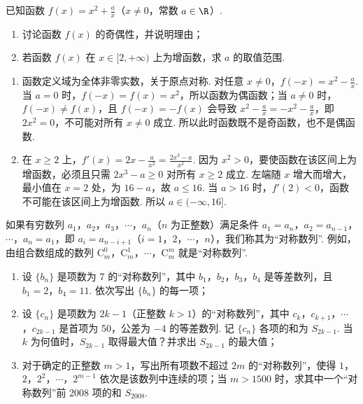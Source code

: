 \begin{problem}
已知函数 \( f(x) = x^2 + \frac{a}{x} \)（\(x \neq 0\)，常数 \(a \in \R\)）.

\begin{enumerate}
\item 讨论函数 \( f(x) \) 的奇偶性，并说明理由；
\item 若函数 \( f(x) \) 在 \( x \in [2, +\infty) \) 上为增函数，求 \( a \) 的取值范围.
\end{enumerate}
\end{problem}

\begin{solution}
\begin{enumerate}
\item 函数定义域为全体非零实数，关于原点对称. 对任意 \(x\ne0\)，\(f(-x)=x^2-\frac{a}{x}\). 当 \(a=0\) 时，\(f(-x)=f(x)=x^2\)，所以函数为偶函数；当 \(a\ne0\) 时，\(f(-x)\ne f(x)\)，且 \(f(-x)=-f(x)\) 会导致 \(x^2-\frac{a}{x}=-x^2-\frac{a}{x}\)，即 \(2x^2=0\)，不可能对所有 \(x\ne0\) 成立. 所以此时函数既不是奇函数，也不是偶函数.
\item 在 \(x\geqslant2\) 上，\(f'(x)=2x-\frac{a}{x^2}=\frac{2x^3-a}{x^2}\). 因为 \(x^2>0\)，要使函数在该区间上为增函数，必须且只需 \(2x^3-a\geqslant0\) 对所有 \(x\geqslant2\) 成立. 左端随 \(x\) 增大而增大，最小值在 \(x=2\) 处，为 \(16-a\)，故 \(a\leqslant16\). 当 \(a>16\) 时，\(f'(2)<0\)，函数不可能在该区间上为增函数. 所以 \(a\in(-\infty,16]\).
\end{enumerate}
\end{solution}

\begin{problem}
如果有穷数列 \(a_1\)，\(a_2\)，\(a_3\)，\(\cdots\)，\(a_n\)（\(n\) 为正整数）满足条件 \(a_1 = a_n\)，\(a_2 = a_{n-1}\)，\(\cdots\)，\(a_n = a_1\)，即 \(a_i = a_{n-i+1}\)（\(i = 1\)，\(2\)，\(\cdots\)，\(n\)），我们称其为“对称数列”. 例如，由组合数组成的数列 \(\mathrm{C}_m^0\)，\(\mathrm{C}_m^1\)，\(\cdots\)，\(\mathrm{C}_m^m\) 就是“对称数列”.

\begin{enumerate}
\item 设 \(\{b_n\}\) 是项数为 7 的“对称数列”，其中 \(b_1\)，\(b_2\)，\(b_3\)，\(b_4\) 是等差数列，且 \(b_1 = 2\)，\(b_4 = 11\). 依次写出 \(\{b_n\}\) 的每一项；
\item 设 \(\{c_n\}\) 是项数为 \(2k - 1\)（正整数 \(k > 1\)）的“对称数列”，其中 \(c_k\)，\(c_{k+1}\)，\(\cdots\)，\(c_{2k-1}\) 是首项为 50，公差为 \(-4\) 的等差数列. 记 \(\{c_n\}\) 各项的和为 \(S_{2k-1}\). 当 \(k\) 为何值时，\(S_{2k-1}\) 取得最大值？并求出 \(S_{2k-1}\) 的最大值；
\item 对于确定的正整数 \(m > 1\)，写出所有项数不超过 \(2m\) 的“对称数列”，使得 \(1\)，\(2\)，\(2^2\)，\(\cdots\)，\(2^{m-1}\) 依次是该数列中连续的项；当 \(m > 1500\) 时，求其中一个“对称数列”前 2008 项的和 \(S_{2008}\).
\end{enumerate}
\end{problem}

